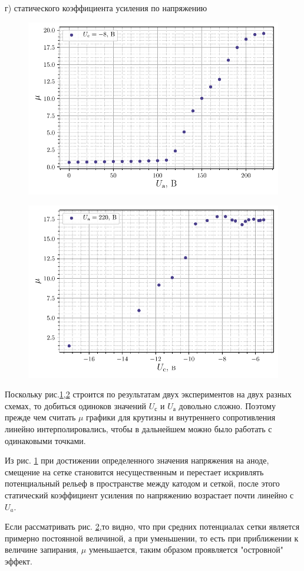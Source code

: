 \newpage
г) статического коэффициента усиления по напряжению
\begin{figure}[h!]
	\centering
    \includegraphics[width=0.65\linewidth]{scripts/fig7}
	\caption{}
	\label{fig:7}
\end{figure}

\begin{figure}[H]
	\centering
    \includegraphics[width=0.7\linewidth]{scripts/fig8}
	\caption{}
	\label{fig:8}
\end{figure}

Поскольку рис.\ref{fig:7},\ref{fig:8}  строится по результатам двух
экспериментов на двух разных схемах, то добиться одиноков значений
$U_{\text{с}}$ и $U_{\text{а}}$ довольно сложно. Поэтому прежде чем считать
$\mu$ графики для крутизны и внутреннего сопротивления линейно
интерполировались, чтобы в дальнейшем можно было работать с одинаковыми
точками.


Из рис. \ref{fig:7} при достижении определенного значения напряжения на аноде,
смещение на сетке становится несущественным и перестает искривлять
потенциальный рельеф в пространстве между катодом и сеткой, после этого
статический коэффициент усиления по напряжению возрастает почти линейно с
$U_a$.

Если рассматривать рис. \ref{fig:8},то видно, что при средних потенциалах сетки
является примерно постоянной величиной, а при уменьшении, то есть при
приближении к величине запирания, $\mu$ уменьшается, таким образом проявляется
"островной" эффект.


